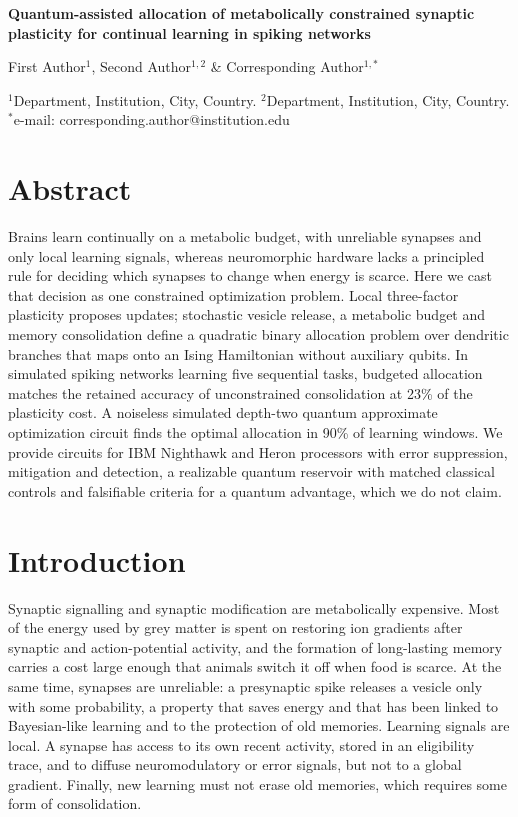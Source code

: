 \documentclass[12pt,a4paper]{article}
\begin{document}
\doublespacing
\linenumbers
\begin{flushleft}
{\LARGE\bfseries Quantum-assisted allocation of metabolically constrained synaptic plasticity for continual learning in spiking networks\par}
\vspace{1em}
{\large First Author$^{1}$, Second Author$^{1,2}$ \& Corresponding Author$^{1,*}$\par}
\vspace{0.5em}
{\small $^{1}$Department, Institution, City, Country. $^{2}$Department, Institution, City, Country. $^{*}$e-mail: corresponding.author@institution.edu\par}
\end{flushleft}

\section*{Abstract}
Brains learn continually on a metabolic budget, with unreliable synapses and only local learning signals, whereas neuromorphic hardware lacks a principled rule for deciding which synapses to change when energy is scarce. Here we cast that decision as one constrained optimization problem. Local three-factor plasticity proposes updates; stochastic vesicle release, a metabolic budget and memory consolidation define a quadratic binary allocation problem over dendritic branches that maps onto an Ising Hamiltonian without auxiliary qubits. In simulated spiking networks learning five sequential tasks, budgeted allocation matches the retained accuracy of unconstrained consolidation at 23\% of the plasticity cost. A noiseless simulated depth-two quantum approximate optimization circuit finds the optimal allocation in 90\% of learning windows. We provide circuits for IBM Nighthawk and Heron processors with error suppression, mitigation and detection, a realizable quantum reservoir with matched classical controls and falsifiable criteria for a quantum advantage, which we do not claim.

\section*{Introduction}

Synaptic signalling and synaptic modification are metabolically expensive. Most of the energy used by grey matter is spent on restoring ion gradients after synaptic and action-potential activity\cite{attwell2001,harris2012}, and the formation of long-lasting memory carries a cost large enough that animals switch it off when food is scarce\cite{placais2013,li2020}. At the same time, synapses are unreliable: a presynaptic spike releases a vesicle only with some probability, a property that saves energy\cite{levy2002} and that has been linked to Bayesian-like learning\cite{malkin2024,kappel2015} and to the protection of old memories\cite{schug2021}. Learning signals are local. A synapse has access to its own recent activity, stored in an eligibility trace, and to diffuse neuromodulatory or error signals, but not to a global gradient\cite{fremaux2016,bellec2020}. Finally, new learning must not erase old memories, which requires some form of consolidation\cite{fusi2005,benna2016,kirkpatrick2017,zenke2017}.
\end{document}

